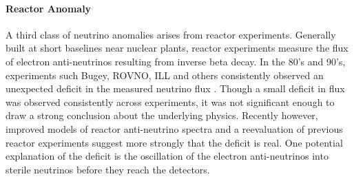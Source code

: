 

\paragraph{Reactor Anomaly}
A third class of neutrino anomalies arises from reactor experiments. Generally built at short baselines near nuclear plants, reactor experiments measure the flux of electron anti-neutrinos resulting from inverse beta decay. In the 80's and 90's, experiments such Bugey, ROVNO, ILL and others consistently observed an unexpected deficit in the measured neutrino flux \cite{bib:bugey} \cite{bib:rovno}. Though a small deficit in flux was observed consistently across experiments, it was not significant enough to draw a strong conclusion about the underlying physics.  Recently however, improved models of reactor anti-neutrino spectra \cite{bib:improvedReactor} and a reevaluation of previous reactor experiments \cite{bib:reactorGeneral} suggest more strongly that the deficit is real.  One potential explanation of the deficit is the oscillation of the electron anti-neutrinos into sterile neutrinos before they reach the detectors.  

